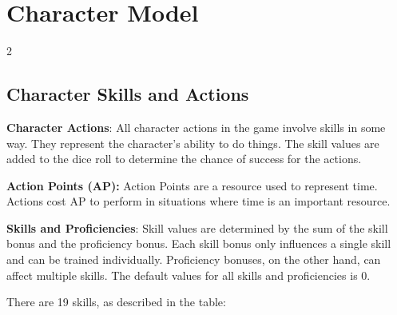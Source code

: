 \chapter{Character Model}

\begin{multicols}{2}

\section{Character Skills and Actions}

\textbf{Character Actions}: All character actions in the game involve skills in some way. They represent the character's ability to do things. The skill values are added to the dice roll to determine the chance of success for the actions.

\textbf{Action Points (AP):} Action Points are a resource used to represent time. Actions cost AP to perform in situations where time is an important resource.

\textbf{Skills and Proficiencies}: Skill values are determined by the sum of the skill bonus and the proficiency bonus. Each skill bonus only influences a single skill and can be trained individually. Proficiency bonuses, on the other hand, can affect multiple skills. The default values for all skills and proficiencies is 0.

There are 19 skills, as described in the table:

\end{multicols}

